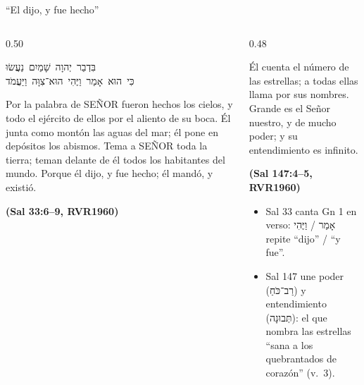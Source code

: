 \documentclass[hyperref={bookmarks=false},aspectratio=169]{beamer}
\newcommand{\heb}[1]{\mbox{\foreignlanguage{hebrew}{#1}}}
\newcommand{\SENOR}{S{\fontsize{0.78em}{1em}\selectfont EÑOR}}
\newcommand{\fuente}[1]{\par\hfill{\upshape\bfseries\footnotesize\textcolor{azul}{#1}}}
\begin{document}
\begin{frame}{``El dijo, y fue hecho''}
\begin{columns}[t,onlytextwidth]
\begin{column}{0.50\textwidth}
\begin{center}\small\heb{בִּדְבַר יְהוָה שָׁמַיִם נַעֲשׂוּ}\\[1pt]\heb{כִּי הוּא אָמַר וַיֶּהִי הוּא־צִוָּה וַיַּעֲמֹד}\end{center}
\begin{cita}[fontupper=\scriptsize\itshape]Por la palabra de \SENOR{} fueron hechos los cielos, y todo el ejército de ellos por el aliento de su boca. Él junta como montón las aguas del mar; él pone en depósitos los abismos. Tema a \SENOR{} toda la tierra; teman delante de él todos los habitantes del mundo. Porque él dijo, y fue hecho; él mandó, y existió.\fuente{(Sal 33:6--9, RVR1960)}\end{cita}
\end{column}
\begin{column}{0.48\textwidth}
\begin{cita}[fontupper=\scriptsize\itshape]Él cuenta el número de las estrellas; a todas ellas llama por sus nombres. Grande es el Señor nuestro, y de mucho poder; y su entendimiento es infinito.\fuente{(Sal 147:4--5, RVR1960)}\end{cita}
\small
\begin{itemize}
\item Sal 33 canta Gn 1 en verso: \heb{אָמַר} / \heb{וַיֶּהִי} repite ``dijo'' / ``y fue''.
\item Sal 147 une poder (\heb{רַב־כֹּחַ}) y entendimiento (\heb{תְּבוּנָה}): el que nombra las estrellas ``sana a los quebrantados de corazón'' (v.~3).
\end{itemize}
\end{column}
\end{columns}
\end{frame}
\end{document}
